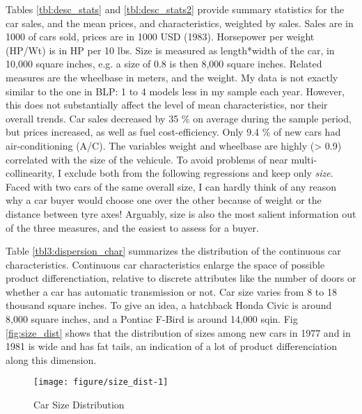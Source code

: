 \documentclass{article}\usepackage[]{graphicx}\usepackage[]{color}
\makeatletter
\def\maxwidth{ %
  \ifdim\Gin@nat@width>\linewidth
    \linewidth
  \else
    \Gin@nat@width
  \fi
}
\newenvironment{knitrout}{}{} %
\makeatother
\begin{document}
Tables \ref{tbl:desc_stats} and \ref{tbl:desc_stats2} provide summary statistics for the car sales, and the mean prices, and characteristics, weighted by sales.  Sales are in 1000 of cars sold, prices are in 1000 USD (1983). Horsepower per weight (HP/Wt) is in HP per 10 lbs. Size is measured as length*width of the car, in 10,000 square inches, e.g. a size of 0.8 is then 8,000 square inches. Related measures are the wheelbase in meters, and the weight. My data is not exactly similar to the one in BLP: 1 to 4 models less in my sample each year. However, this does not substantially affect the level of mean characteristics, nor their overall trends.  Car sales decreased by 35 \% on average during the sample period, but prices increased, as well as fuel cost-efficiency. Only 9.4 \% of new cars had air-conditioning (A/C). The variables weight and wheelbase are highly (> 0.9) correlated with the size of the vehicule. To avoid problems of near multi-collinearity, I exclude both from the following regressions and keep only \emph{size}. Faced with two cars of the same overall size, I can hardly think of any reason why a car buyer would choose one over the other because of weight or the distance between tyre axes! Arguably, size is also the most salient information out of the three measures, and the easiest to assess for a buyer. 

Table \ref{tbl3:dispersion_char} summarizes the distribution of the continuous car characteristics. Continuous car characteristics enlarge the space of possible product differenctiation, relative to discrete attributes like the number of doors or whether a car has automatic transmission or not. Car size varies from 8 to 18 thousand square inches. To give an idea, a hatchback Honda Civic is around 8,000 square inches, and a Pontiac F-Bird is around 14,000 sqin. Fig \ref{fig:size_dist} shows that the distribution of sizes among new cars in 1977 and in 1981 is wide and has fat tails, an indication of a lot of product differenciation along this dimension.

\begin{knitrout}
\color{fgcolor}\begin{figure}
\texttt{[image: figure/size\_dist-1]} \caption[Car Size Distribution]{Car Size Distribution}\label{fig:size_distsize_dist}
\end{figure}


\end{knitrout}
%


%
\end{document}
